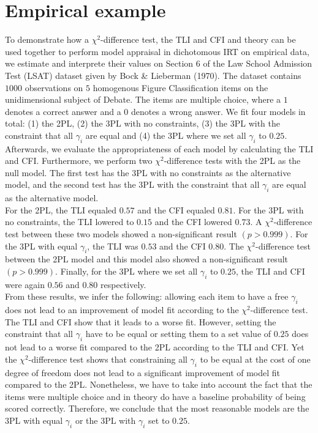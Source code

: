 \documentclass[Royal,sageapa,times,doublespace]{sagej}
\begin{document}
\section{\centering Empirical example}
To demonstrate how a $\chi^2$-difference test, the TLI and CFI and theory can be used together to perform model appraisal in dichotomous IRT on empirical data, we estimate and interprete their values on Section 6 of the Law School Admission Test (LSAT) dataset given by Bock \& Lieberman (1970). The dataset contains $1000$ observations on $5$ homogenous Figure Classification items on the unidimensional subject of Debate. The items are multiple choice, where a $1$ denotes a correct answer and a $0$ denotes a wrong answer. We fit four models in total: (1) the 2PL, (2) the 3PL with no constraints, (3) the 3PL with the constraint that all $\gamma_i$ are equal and (4) the 3PL where we set all $\gamma_i$ to $0.25$. Afterwards, we evaluate the appropriateness of each model by calculating the TLI and CFI. Furthermore, we perform two $\chi^2$-difference tests with the 2PL as the null model. The first test has the 3PL with no constraints as the alternative model, and the second test has the 3PL with the constraint that all $\gamma_i$ are equal as the alternative model. \\
\indent For the 2PL, the TLI equaled $0.57$ and the CFI equaled $0.81$. For the 3PL with no constraints, the TLI lowered to $0.15$ and the CFI lowered $0.73$. A $\chi^2$-difference test between these two models showed a non-significant result $(p > 0.999)$. For the 3PL with equal $\gamma_i$, the TLI was $0.53$ and the CFI $0.80$. The $\chi^2$-difference test between the 2PL model and this model also showed a non-significant result $(p > 0.999)$. Finally, for the 3PL where we set all $\gamma_i$ to $0.25$, the TLI and CFI were again $0.56$ and $0.80$ respectively. \\
\indent From these results, we infer the following: allowing each item to have a free $\gamma_i$ does not lead to an improvement of model fit according to the $\chi^2$-difference test. The TLI and CFI show that it leads to a worse fit. However, setting the constraint that all $\gamma_i$ have to be equal or setting them to a set value of $0.25$ does not lead to a worse fit compared to the 2PL according to the TLI and CFI. Yet the $\chi^2$-difference test shows that constraining all $\gamma_i$ to be equal at the cost of one degree of freedom does not lead to a significant improvement of model fit compared to the 2PL. Nonetheless, we have to take into account the fact that the items were multiple choice and in theory do have a baseline probability of being scored correctly. Therefore, we conclude that the most reasonable models are the 3PL with equal $\gamma_i$ or the 3PL with $\gamma_i$ set to $0.25$. \\
\end{document}
